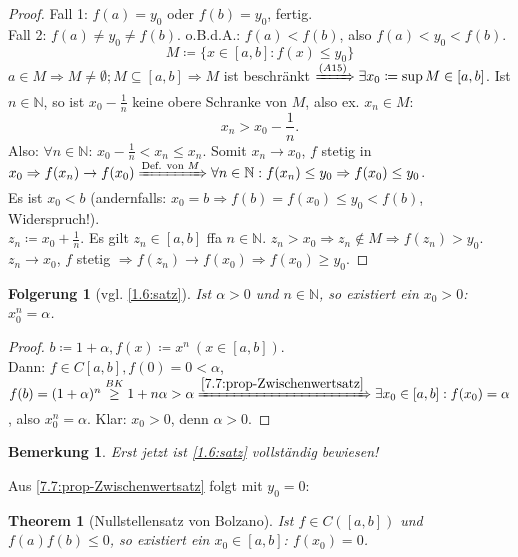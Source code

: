 \documentclass[12pt]{extreport} %
\newcommand{\N}{\mathbb{N}}
\theoremstyle{named}
\newtheorem{unnamedtheorem}{Theorem} \counterwithin{unnamedtheorem}{chapter}
\theoremstyle{dotless}
\newtheorem*{bemerkung}{Bemerkung}
\newtheorem*{folgerung*}{Folgerung}
\begin{document}
\begin{proof}
	Fall 1: $f(a) = y_{0}$ oder $f(b) = y_{0}$, fertig. \\
	Fall 2: $f(a) \neq y_{0} \neq f(b)$. o.B.d.A.: $f(a) < f(b)$, also $f(a) < y_{0} < 	f(b)$.
	$$ M \coloneqq \{ x \in [a, b]: f(x) \leq y_{0} \} $$
	$a \in M \Rightarrow M \neq \emptyset; M \subseteq [a, b] \Rightarrow M$ ist beschränkt $\xRightarrow[]{(A15)} \exists x_{0} \coloneqq \sup M \in [a, b]$. Ist $n \in \N$, so ist $x_{0} - \frac{1}{n}$ keine obere Schranke von $M$, also ex. $x_{n} \in M$:
		$$ x_{n} > x_{0} - \frac{1}{n}. $$
	Also: $\forall n \in \N$: $x_{0} - \frac{1}{n} < x_{n} \leq x_{n}$. Somit $x_{n} \rightarrow x_{0}$, $f$ stetig in $x_{0} \Rightarrow f(x_{n}) \rightarrow f(x_{0}) \xRightarrow[]{\text{Def. von }M} \forall n \in \N: f(x_{n}) \leq y_{0} \Rightarrow f(x_{0}) \leq y_{0}$. \\
	Es ist $x_{0} < b$ (andernfalls: $x_{0} = b \Rightarrow f(b) = f(x_{0}) \leq y_{0} < f(b)$, Widerspruch!). \\
	$z_{n} \coloneqq x_{0} + \frac{1}{n}$. Es gilt $z_{n} \in [a, b]$ ffa $n \in \N$. $z_{n} > x_{0} \Rightarrow z_{n} \notin M \Rightarrow f(z_{n}) > y_{0}$. $z_{n} \rightarrow x_{0}$, $f$ stetig $\Rightarrow f(z_{n}) \rightarrow f(x_{0}) \Rightarrow f(x_{0}) \geq y_{0}$.
\end{proof}


\begin{folgerung*}[vgl. \ref{1.6:satz}]
	Ist $\alpha > 0$ und $n \in \N$, so existiert ein $x_{0} > 0$: $x_{0}^{n} = \alpha$.	
\end{folgerung*}

\begin{proof}
	$b \coloneqq 1 + \alpha, f(x) \coloneqq x^{n} ~(x \in [a, b])$. \\
	Dann: $f \in C[a, b], f(0) = 0 < \alpha$, $f(b) = (1 + \alpha)^{n} \overset{BK}{\geq} 1 + n \alpha > \alpha \xRightarrow[]{\ref{7.7:prop-Zwischenwertsatz}} \exists x_{0} \in [a, b]: f(x_{0}) = \alpha$, also $x_{0}^{n} = \alpha$. Klar: $x_{0} > 0$, denn $\alpha > 0$.
\end{proof}

\begin{bemerkung}
	Erst jetzt ist \ref{1.6:satz} vollständig bewiesen!
\end{bemerkung}


Aus \ref{7.7:prop-Zwischenwertsatz} folgt mit $y_{0} = 0$:

\begin{unnamedtheorem}[Nullstellensatz von Bolzano] \label{7.8:prop-NullstellensatzVonBolzano}
	Ist $f \in C\left([a, b]\right)$ und $f(a)f(b) \leq 0$, so existiert ein $x_{0} \in [a, b]$: $f(x_{0}) = 0$.
	
\end{unnamedtheorem}
\end{document}
